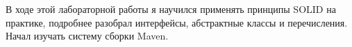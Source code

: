 В ходе этой лабораторной работы я научился применять принципы SOLID на практике, подробнее разобрал интерфейсы, абстрактные классы и перечисления. Начал изучать систему сборки Maven.
